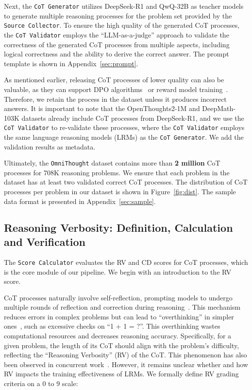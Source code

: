 \documentclass{article}
\begin{document}
Next, the \texttt{CoT Generator} utilizes DeepSeek-R1 and QwQ-32B as teacher models to generate multiple reasoning processes for the problem set provided by the \texttt{Source Collector}. To ensure the high quality of the generated CoT processes, the \texttt{CoT Validator} employs the ``LLM-as-a-judge'' approach to validate the correctness of the generated CoT processes from multiple aspects, including logical correctness and the ability to derive the correct answer. The prompt template is shown in Appendix~\ref{sec:prompt}.

As mentioned earlier, releasing CoT processes of lower quality can also be valuable, as they can support DPO algorithms~\cite{DBLP:conf/nips/RafailovSMMEF23} or reward model training~\cite{DBLP:conf/nips/Ouyang0JAWMZASR22}. Therefore, we retain the process in the dataset unless it produces incorrect answers. It is important to note that the OpenThoughts2-1M and DeepMath-103K datasets already include CoT processes from DeepSeek-R1, and we use the \texttt{CoT Validator} to re-validate these processes, where the \texttt{CoT Validator} employs the same language reasoning models (LRMs) as the \texttt{CoT Generator}. We add the validation results as metadata.

Ultimately, the \texttt{OmniThought} dataset contains more than \textbf{2 million} CoT processes for 708K reasoning problems. We ensure that each problem in the dataset has at least two validated correct CoT processes. The distribution of CoT processes per problem in our dataset is shown in Figure~\ref{fig:dist}. The sample data format is presented in Appendix~\ref{sec:sample}.

\subsection{Reasoning Verbosity: Definition, Calculation and Verification}

The \texttt{Score Calculator} evaluates the RV and CD scores for CoT processes, which is the core module of our pipeline. We begin with an introduction to the RV score.

CoT processes naturally involve self-reflection, prompting models to undergo multiple rounds of reflection and correction during reasoning~\cite{DBLP:journals/corr/abs-2310-06692}. This mechanism reduces errors in complex problems but can lead to ``overthinking'' in simpler ones~\cite{DBLP:journals/corr/abs-2501-18585}, such as excessive checks on ``1 + 1 = ?''. This overthinking wastes computational resources and decreases reasoning accuracy. Specifically, for a given problem, the length of its CoT should align with the problem's difficulty, reflecting the ``Reasoning Verbosity'' (RV) of the CoT. This phenomenon has also been observed in concurrent work~\cite{DBLP:journals/corr/abs-2502-18080}. However, it remains unclear whether and how RV impacts the training effectiveness of LRMs. We formally define RV grading criteria on a 0 to 9 scale:
\end{document}
